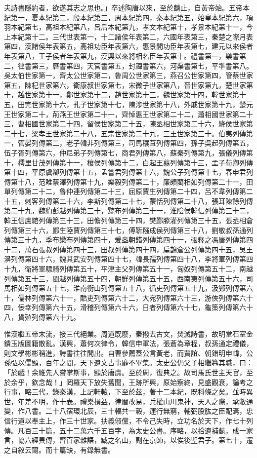 \begin{pinyinscope}
夫詩書隱約者，欲遂其志之思也。」卒述陶唐以來，至於麟止，自黃帝始。五帝本紀第一，夏本紀第二，殷本紀第三，周本紀第四，秦本紀第五，始皇本紀第六，項羽本紀第七，高祖本紀第八，呂后本紀第九，孝文本紀第十，孝景本紀第十一，今上本紀第十二。三代世表第一，十二諸侯年表第二，六國年表第三，秦楚之際月表第四，漢諸侯年表第五，高祖功臣年表第六，惠景間功臣年表第七，建元以來侯者年表第八，王子侯者年表第九，漢興以來將相名臣年表第十。禮書第一，樂書第二，律書第三，曆書第四，天官書第五，封禪書第六，河渠書第七，平準書第八。吳太伯世家第一，齊太公世家第二，魯周公世家第三，燕召公世家第四，管蔡世家第五，陳杞世家第六，衛康叔世家第七，宋微子世家第八，晉世家第九，楚世家第十，越世家第十一，鄭世家第十二，趙世家第十三，魏世家第十四，韓世家第十五，田完世家第十六，孔子世家第十七，陳涉世家第十八，外戚世家第十九，楚元王世家第二十，荊燕王世家第二十一，齊悼惠王世家第二十二，蕭相國世家第二十三，曹相國世家第二十四，留侯世家第二十五，陳丞相世家第二十六，絳侯世家第二十七，梁孝王世家第二十八，五宗世家第二十九，三王世家第三十。伯夷列傳第一，管晏列傳第二，老子韓非列傳第三，司馬穰苴列傳第四，孫子吳起列傳第五，伍子胥列傳第六，仲尼弟子列傳第七，商君列傳第八，蘇秦列傳第九，張儀列傳第十，樗里甘茂列傳第十一，穰侯列傳第十二，白起王翦列傳第十三，孟子荀卿列傳第十四，平原虞卿列傳第十五，孟嘗君列傳第十六，魏公子列傳第十七，春申君列傳第十八，范睢蔡澤列傳第十九，樂毅列傳第二十，廉頗藺相如列傳第二十一，田單列傳第二十二，魯仲連列傳第二十三，屈原賈生列傳第二十四，呂不韋列傳第二十五，刺客列傳第二十六，李斯列傳第二十七，蒙恬列傳第二十八，張耳陳餘列傳第二十九，魏豹彭越列傳第三十，黥布列傳第三十一，淮陰侯韓信列傳第三十二，韓王信盧綰列傳第三十三，田儋列傳第三十四，樊酈滕灌列傳第三十五，張丞相倉列傳第三十六，酈生陸賈列傳第三十七，傅靳糨成侯列傳第三十八，劉敬叔孫通列傳第三十九，季布欒布列傳第四十，爰盎朝錯列傳第四十一，張釋之馮唐列傳第四十二，萬石張叔列傳第四十三，田叔列傳第四十四，扁鵲倉公列傳第四十五，吳王濞列傳第四十六，魏其武安列傳第四十七，韓長孺列傳第四十八，李將軍列傳第四十九，衛將軍驃騎列傳第五十，平津主父列傳第五十一，匈奴列傳第五十二，南越列傳第五十三，閩越列傳第五十四，朝鮮列傳第五十五，西南夷列傳第五十六，司馬相如列傳第五十七，淮南衡山列傳第五十八，循吏列傳第五十九，汲鄭列傳第六十，儒林列傳第六十一，酷吏列傳第六十二，大宛列傳第六十三，游俠列傳第六十四，佞幸列傳第六十五，滑稽列傳第六十六，日者列傳第六十七，龜策列傳第六十八，貨殖列傳第六十九。

惟漢繼五帝末流，接三代絕業。周道既廢，秦撥去古文，焚滅詩書，故明堂石室金鐀玉版圖籍散亂。漢興，蕭何次律令，韓信申軍法，張蒼為章程，叔孫通定禮儀，則文學彬彬稍進，詩書往往間出。自曹參薦蓋公言黃老，而賈誼、朝錯明申韓，公孫弘以儒顯，百年之間，天下遺文古事靡不畢集。太史公仍父子相繼篹其職，曰：「於戲！余維先人嘗掌斯事，顯於唐虞。至於周，復典之。故司馬氏世主天官，至於余乎，欽念哉！」罔羅天下放失舊聞，王跡所興，原始察終，見盛觀衰，論考之行事，略三代，錄秦漢，上記軒轅，下至於茲，著十二本紀，既科條之矣。並時異世，年差不明，作十表。禮樂損益，律曆改易，兵權山川鬼神，天人之際，承敝通變，作八書。二十八宿環北辰，三十輻共一轂，運行無窮，輔弼股肱之臣配焉，忠信行道以奉主上，作三十世家。扶義俶儻，不令己失時，立功名於天下，作七十列傳。凡百三十篇，五十二萬六千五百字，為太史公書。序略，以拾遺補蓺，成一家言，協六經異傳，齊百家雜語，臧之名山，副在京師，以俟後聖君子。第七十，遷之自敘云爾。而十篇缺，有錄無書。


\end{pinyinscope}
